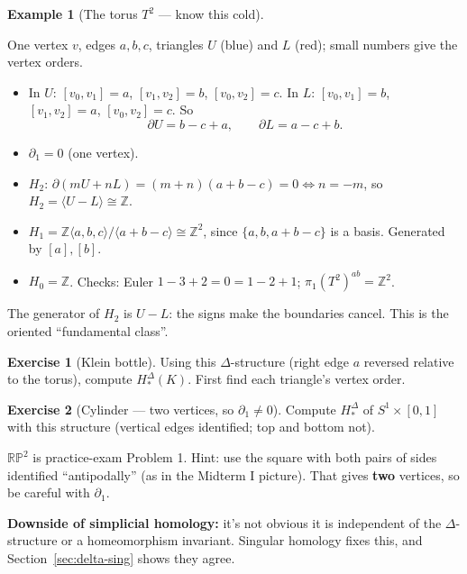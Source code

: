 \documentclass[11pt]{article}
\newcommand{\Z}{\mathbb Z}
\newcommand{\RP}{\mathbb{RP}}
\newcommand{\fig}[2]{\begin{center}\resizebox{#2}{!}{}\end{center}}
\theoremstyle{definition}
\newtheorem{ex}[thm]{Example}
\newtheorem{exercise}{Exercise}[section]
\begin{document}
\begin{ex}[The torus $T^2$ --- know this cold]\label{ex:torus}
\fig{torus-delta}{0.4\textwidth}
One vertex $v$, edges $a,b,c$, triangles $U$ (blue) and $L$ (red); small numbers give the vertex orders.
\begin{itemize}
\item In $U$: $[v_0,v_1]=a$, $[v_1,v_2]=b$, $[v_0,v_2]=c$. In $L$: $[v_0,v_1]=b$, $[v_1,v_2]=a$, $[v_0,v_2]=c$. So
\[\partial U=b-c+a,\qquad\partial L=a-c+b.\]
\item $\partial_1=0$ (one vertex).
\item $H_2$: $\partial(mU+nL)=(m+n)(a+b-c)=0\iff n=-m$, so $H_2=\langle U-L\rangle\cong\Z$.
\item $H_1=\Z\langle a,b,c\rangle/\langle a+b-c\rangle\cong\Z^2$, since $\{a,b,a+b-c\}$ is a basis. Generated by $[a],[b]$.
\item $H_0=\Z$. Checks: Euler $1-3+2=0=1-2+1$; $\pi_1(T^2)^{ab}=\Z^2$.
\end{itemize}
The generator of $H_2$ is $U-L$: the signs make the boundaries cancel. This is the oriented ``fundamental class''.
\end{ex}

\begin{exercise}[Klein bottle]\label{exr:klein}
Using this $\Delta$-structure (right edge $a$ reversed relative to the torus), compute $H^\Delta_*(K)$. First find each triangle's vertex order.
\fig{klein-delta}{0.4\textwidth}
\end{exercise}

\begin{exercise}[Cylinder --- two vertices, so $\partial_1\neq0$]\label{exr:cyl}
Compute $H^\Delta_*$ of $S^1\times[0,1]$ with this structure (vertical edges identified; top and bottom not).
\fig{cylinder-delta}{0.4\textwidth}
\end{exercise}

\begin{note}
$\RP^2$ is practice-exam Problem 1. Hint: use the square with both pairs of sides identified ``antipodally'' (as in the Midterm I picture). That gives \textbf{two} vertices, so be careful with $\partial_1$.
\end{note}

\textbf{Downside of simplicial homology:} it's not obvious it is independent of the $\Delta$-structure or a homeomorphism invariant. Singular homology fixes this, and Section~\ref{sec:delta-sing} shows they agree.

\end{document}
